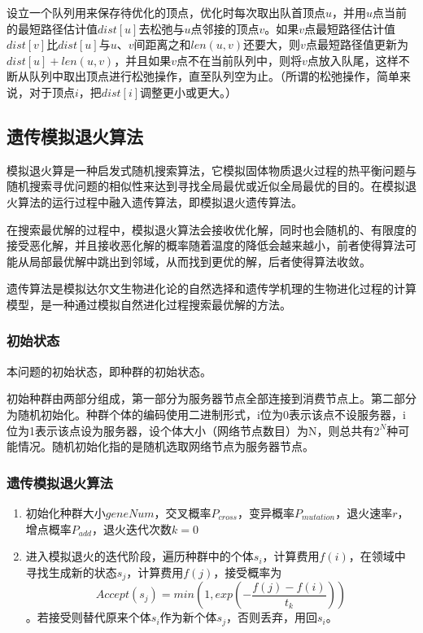 \documentclass[a4paper,11pt,onecolumn,twoside]{article}
\begin{document}
\begin{multicols}{2}
设立一个队列用来保存待优化的顶点，优化时每次取出队首顶点$u$，并用$u$点当前的最短路径估计值$dist[u]$去松弛与$u$点邻接的顶点$v$。如果$v$点最短路径估计值$dist[v]$比$dist[u]$与$u$、$v$间距离之和$len(u,v)$还要大，则$v$点最短路径值更新为$dist[u]+len(u,v)$，并且如果$v$点不在当前队列中，则将$v$点放入队尾，这样不断从队列中取出顶点进行松弛操作，直至队列空为止。（所谓的松弛操作，简单来说，对于顶点$i$，把$dist[i]$调整更小或更大。）

\subsection{遗传模拟退火算法}

模拟退火算是一种启发式随机搜索算法，它模拟固体物质退火过程的热平衡问题与随机搜索寻优问题的相似性来达到寻找全局最优或近似全局最优的目的。在模拟退火算法的运行过程中融入遗传算法，即模拟退火遗传算法。

在搜索最优解的过程中，模拟退火算法会接收优化解，同时也会随机的、有限度的接受恶化解，并且接收恶化解的概率随着温度的降低会越来越小，前者使得算法可能从局部最优解中跳出到邻域，从而找到更优的解，后者使得算法收敛。

遗传算法是模拟达尔文生物进化论的自然选择和遗传学机理的生物进化过程的计算模型，是一种通过模拟自然进化过程搜索最优解的方法。

\subsubsection{初始状态}

本问题的初始状态，即种群的初始状态。

初始种群由两部分组成，第一部分为服务器节点全部连接到消费节点上。第二部分为随机初始化。种群个体的编码使用二进制形式，i位为0表示该点不设服务器，i位为1表示该点设为服务器，设个体大小（网络节点数目）为N，则总共有$2^N$种可能情况。随机初始化指的是随机选取网络节点为服务器节点。

\subsubsection{遗传模拟退火算法}

\begin{enumerate}
\item 初始化种群大小$geneNum$，交叉概率$P_{cross}$，变异概率$P_{mutation}$，退火速率$r$，增点概率$P_{add}$，退火迭代次数$k=0$
\item 进入模拟退火的迭代阶段，遍历种群中的个体$s_i$，计算费用$f(i)$，在领域中寻找生成新的状态$s_j$，计算费用$f(j)$，接受概率为
$$Accept(s_j)=min(1,exp(-\frac{f(j)-f(i)}{t_k}))$$。若接受则替代原来个体$s_i$作为新个体$s_j$，否则丢弃，用回$s_i$。


\end{enumerate}
\end{multicols}
\end{document}
